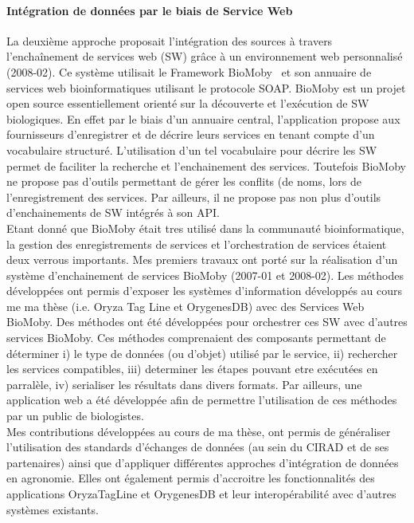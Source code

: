 \paragraph*{Intégration de données par le biais de Service Web} La deuxième approche proposait l’intégration des sources à travers l’enchaînement de services web (SW) grâce à un environnement web personnalisé (2008-02). Ce système utilisait le Framework BioMoby~\cite{Wilkinson2002a,Wilkinson2005a}  et son annuaire de services web bioinformatiques utilisant le protocole SOAP. BioMoby est un projet open source essentiellement orienté sur la découverte et l’exécution de SW biologiques. En effet par le biais d’un annuaire central, l’application propose aux fournisseurs d’enregistrer et de décrire leurs services en tenant compte d’un vocabulaire structuré. L’utilisation d’un tel vocabulaire pour décrire les SW permet de faciliter la recherche et l’enchainement des services. Toutefois BioMoby ne propose pas d’outils permettant de gérer les conflits (de noms, lors de l'enregistrement des services. Par ailleurs, il ne propose pas non plus d'outils d’enchainements de SW intégrés à son API. \\
Etant donné que BioMoby était tres utilisé dans la communauté bioinformatique, la gestion des enregistrements de services et l'orchestration de services étaient deux verrous importants. Mes premiers travaux ont porté sur la réalisation d'un système d'enchainement de services BioMoby (2007-01 et 2008-02). Les méthodes développées ont permis d'exposer les systèmes d'information développés au cours me ma thèse (i.e. Oryza Tag Line et OrygenesDB) avec des Services Web BioMoby. Des méthodes ont été développées pour orchestrer ces SW avec d'autres services BioMoby. Ces méthodes comprenaient des composants permettant de déterminer i) le type de données (ou d'objet) utilisé par le service, ii) rechercher les services compatibles, iii) determiner les étapes pouvant etre exécutées en parralèle,  iv) serialiser les résultats dans divers formats. Par ailleurs, une application web a été développée afin de permettre l'utilisation de ces méthodes par un public de biologistes. \\

Mes contributions développées au cours de ma thèse, ont permis de généraliser l’utilisation des standards d’échanges de données (au sein du CIRAD et de ses partenaires) ainsi que d’appliquer différentes approches d’intégration de données en agronomie. Elles ont également permis d’accroitre les fonctionnalités des applications OryzaTagLine et OrygenesDB et leur interopérabilité avec d’autres systèmes existants.

